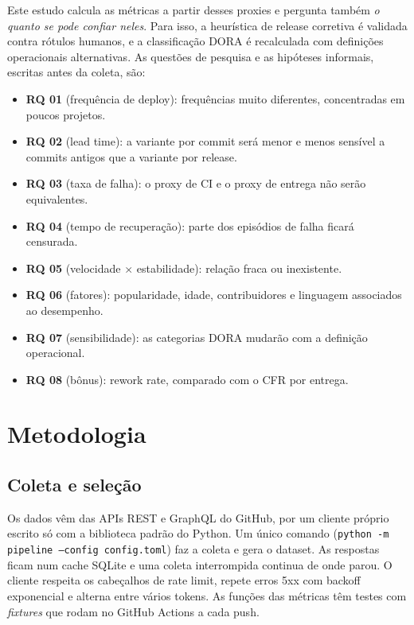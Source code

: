 \documentclass[12pt]{article}
\begin{document}
Este estudo calcula as métricas a partir desses proxies e pergunta também \textit{o quanto se pode confiar neles}. Para isso, a heurística de release corretiva é validada contra rótulos humanos, e a classificação DORA é recalculada com definições operacionais alternativas. As questões de pesquisa e as hipóteses informais, escritas antes da coleta, são:

\begin{itemize}
\item \textbf{RQ 01} (frequência de deploy): frequências muito diferentes, concentradas em poucos projetos.
\item \textbf{RQ 02} (lead time): a variante por commit será menor e menos sensível a commits antigos que a variante por release.
\item \textbf{RQ 03} (taxa de falha): o proxy de CI e o proxy de entrega não serão equivalentes.
\item \textbf{RQ 04} (tempo de recuperação): parte dos episódios de falha ficará censurada.
\item \textbf{RQ 05} (velocidade $\times$ estabilidade): relação fraca ou inexistente.
\item \textbf{RQ 06} (fatores): popularidade, idade, contribuidores e linguagem associados ao desempenho.
\item \textbf{RQ 07} (sensibilidade): as categorias DORA mudarão com a definição operacional.
\item \textbf{RQ 08} (bônus): rework rate, comparado com o CFR por entrega.
\end{itemize}

\section{Metodologia}

\subsection{Coleta e seleção}

Os dados vêm das APIs REST e GraphQL do GitHub, por um cliente próprio escrito só com a biblioteca padrão do Python. Um único comando (\texttt{python -m pipeline --config config.toml}) faz a coleta e gera o dataset. As respostas ficam num cache SQLite e uma coleta interrompida continua de onde parou. O cliente respeita os cabeçalhos de rate limit, repete erros 5xx com backoff exponencial e alterna entre vários tokens. As funções das métricas têm testes com \textit{fixtures} que rodam no GitHub Actions a cada push.
\end{document}
